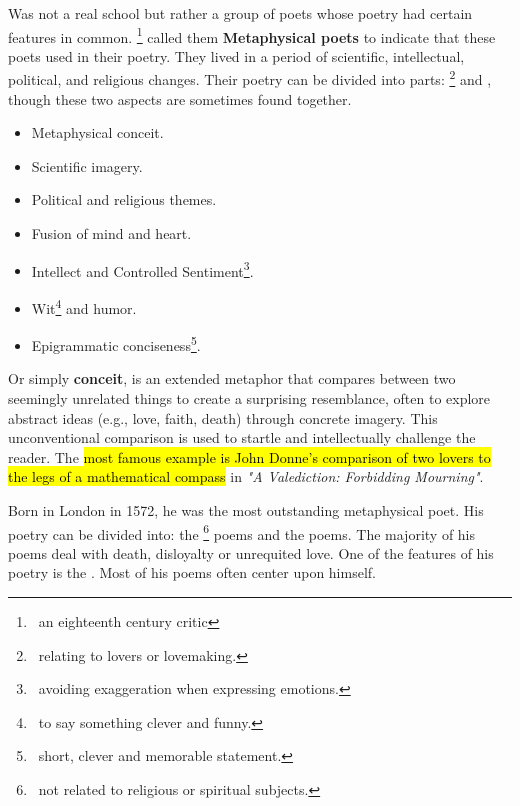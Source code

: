 
Was not a real school but rather a group of poets whose poetry
had certain features in common. \footnote{\, an eighteenth century critic}
called them \textbf{Metaphysical poets} to indicate that these poets used  in their poetry. They lived in a period of scientific, intellectual, political, and religious 
changes. Their poetry can be divided into parts: \footnote{\, relating to lovers or lovemaking.} 
and , though these two aspects are sometimes found together.


\begin{itemize}
  \item Metaphysical conceit.
  \item Scientific imagery.
  \item Political and religious themes.
  \item Fusion of mind and heart.
  \item Intellect and Controlled Sentiment\footnote{\, avoiding exaggeration when expressing emotions.}.
  \item Wit\footnote{\, to say something clever and funny.} and humor.
  \item Epigrammatic conciseness\footnote{\, short, clever and memorable statement.}.
\end{itemize}


Or simply \textbf{conceit}, is an extended metaphor that compares between two
seemingly unrelated things to create a surprising resemblance, often to explore 
abstract ideas (e.g., love, faith, death) through concrete imagery.
This unconventional comparison is used to startle and intellectually challenge the reader.
The \hl{most famous example is John Donne's comparison of
two lovers to the legs of a mathematical compass} in \textit{"A Valediction: Forbidding Mourning"}.


Born in London in 1572, he was the most outstanding metaphysical poet. His poetry can be divided into: 
the \footnote{\, not related to religious or spiritual subjects.}
poems and the  poems. The majority of his poems deal with 
death, disloyalty or unrequited love. One of the features of his poetry is the . Most of his poems often center upon himself.

